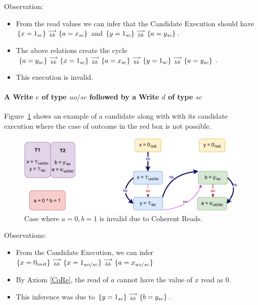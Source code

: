         Observation:
        \begin{itemize}
            \item From the read values we can infer that the Candidate Execution should have $\{x=1_{sc}\}\stackrel{\longrightarrow}{_{hb}}\{a=x_{sc}\}$ and $\{y=1_{sc}\}\stackrel{\longrightarrow}{_{hb}}\{a=y_{sc}\}$.
            \item The above relations create the cycle $\{a=y_{sc}\}\stackrel{\longrightarrow}{_{hb}}\{x=1_{sc}\}\stackrel{\longrightarrow}{_{hb}}\{a=x_{sc}\}\stackrel{\longrightarrow}{_{hb}}\{y=1_{sc}\}\stackrel{\longrightarrow}{_{hb}}\{a=y_{sc}\}$.
            \item This execution is invalid. 
        \end{itemize}


    \paragraph{A Write $e$ of type $uo/sc$ followed by a Write $d$ of type $sc$}
        
        Figure~\ref{reord_counter:example4(a)} shows an example of a candidate along with with its candidate execution where the case of outcome in the red box is not possible. 
        \begin{figure}[H]
            \centering
            \includegraphics[scale=0.7]{5.InstructionReordering/4.ValidReorderingCandidate/Example7(Wuo,sc-Wsc).pdf}
            \caption{Case where $a = 0, b = 1$ is invalid due to Coherent Reads.}
            \label{reord_counter:example4(a)}
        \end{figure}
        
        Observations:
        \begin{itemize}
            \item From the Candidate Execution, we can infer $\{x=0_{init}\}\stackrel{\longrightarrow}{_{hb}}\{x=1_{uo/sc}\}\stackrel{\longrightarrow}{_{hb}}\{a=x_{uo/sc}\}$
            \item By Axiom \ref{CoRe}, the read of $a$ cannot have the value of $x$ read as $0$. 
            \item This inference was due to $\{y=1_{sc}\}\stackrel{\longrightarrow}{_{hb}}\{b=y_{sc}\}$.
        \end{itemize}

